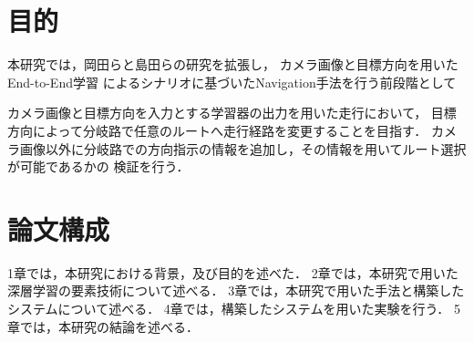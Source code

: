 \section{目的}
本研究では，岡田らと島田らの研究を拡張し，
カメラ画像と目標方向を用いたEnd-to-End学習
によるシナリオに基づいたNavigation手法を行う前段階として

カメラ画像と目標方向を入力とする学習器の出力を用いた走行において，
目標方向によって分岐路で任意のルートへ走行経路を変更することを目指す．
カメラ画像以外に分岐路での方向指示の情報を追加し，その情報を用いてルート選択が可能であるかの
検証を行う．


\section{論文構成}
1章では，本研究における背景，及び目的を述べた．
2章では，本研究で用いた深層学習の要素技術について述べる．
3章では，本研究で用いた手法と構築したシステムについて述べる．
4章では，構築したシステムを用いた実験を行う．
5章では，本研究の結論を述べる．
